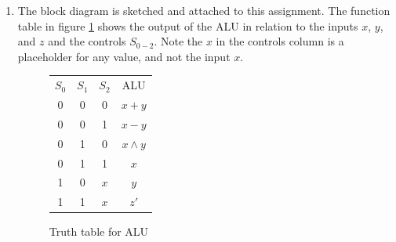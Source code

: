 \documentclass{article}
\title{
    $A_{#1}$ \\ {\large Assignment \uppercase\expandafter{\romannumeral #1}} \\
    {\normalsize Prof. #2; #3}
  }
\author{Connor Taffe}
\begin{document}
  \maketitle

  \begin{enumerate}

    \item{
      The block diagram is sketched and attached to this assignment.
      The function table in figure \ref{alutt} shows the output of the ALU in relation
      to the inputs $x$, $y$, and $z$ and the controls $S_{0-2}$. Note the $x$
      in the controls column is a placeholder for any value, and not the input
      $x$.
      \begin{figure}[h]
        \centering
        \begin{tabular}[h]{c c c | c}
          $S_{0}$ & $S_{1}$ & $S_{2}$ & ALU \\
          0 & 0 & 0 & $x+y$ \\
          0 & 0 & 1 & $x-y$ \\
          0 & 1 & 0 & $x\land y$ \\
          0 & 1 & 1 & $x$ \\
          1 & 0 & $x$ & $y$ \\
          1 & 1 & $x$ & $z'$ \\
        \end{tabular}
        \caption{\label{alutt} Truth table for ALU}
      \end{figure}
    }


\end{enumerate}
\end{document}
